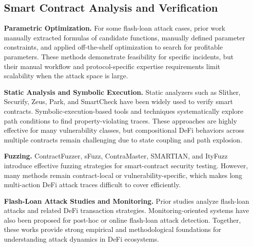 \subsection{Smart Contract Analysis and Verification}

\noindent \textbf{Parametric Optimization.}
For some flash-loan attack cases, prior work manually extracted formulas of candidate functions,
manually defined parameter constraints, and applied off-the-shelf optimization to search for profitable parameters\cite{cao2021flashot,qin2021attacking}.
These methods demonstrate feasibility for specific incidents, but their manual workflow and protocol-specific expertise requirements
limit scalability when the attack space is large.

\noindent \textbf{Static Analysis and Symbolic Execution.}
Static analyzers such as Slither, Securify, Zeus, Park, and SmartCheck\cite{feist2019slither,tsankov2018securify,kalra2018zeus,zheng2022park,tikhomirov2018smartcheck}
have been widely used to verify smart contracts.
Symbolic-execution-based tools and techniques\cite{king1976symbolic,mythril,luu2016making,liu2020towards,frank2020ethbmc,feng2019precise,mossberg2019manticore}
systematically explore path conditions to find property-violating traces.
These approaches are highly effective for many vulnerability classes,
but compositional DeFi behaviors across multiple contracts remain challenging due to state coupling and path explosion.

\noindent \textbf{Fuzzing.}
ContractFuzzer, sFuzz, ContraMaster, SMARTIAN, and ItyFuzz\cite{jiang2018contractfuzzer,nguyen2020sfuzz,wang2020oracle,choi2021smartian,shou2023ityfuzz}
introduce effective fuzzing strategies for smart-contract security testing.
However, many methods remain contract-local or vulnerability-specific,
which makes long multi-action DeFi attack traces difficult to cover efficiently.

\noindent \textbf{Flash-Loan Attack Studies and Monitoring.}
Prior studies analyze flash-loan attacks and related DeFi transaction strategies\cite{qin2021attacking,cao2021flashot,werapun2022flash,wang2021towards,gan2022understanding}.
Monitoring-oriented systems have also been proposed for post-hoc or online flash-loan attack detection\cite{xia2023detecting,ramezany2023midnight,wang2022defiscanner}.
Together, these works provide strong empirical and methodological foundations for understanding attack dynamics in DeFi ecosystems.
